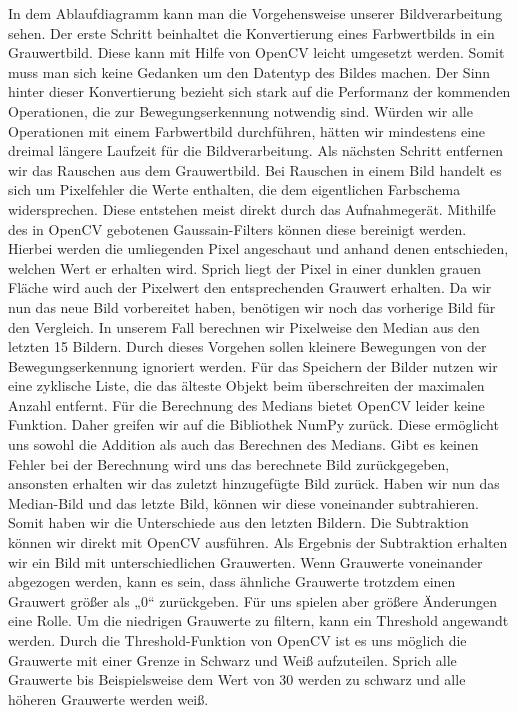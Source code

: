 In dem Ablaufdiagramm kann man die Vorgehensweise unserer Bildverarbeitung sehen. Der erste Schritt beinhaltet die Konvertierung eines Farbwertbilds in ein Grauwertbild. Diese kann mit Hilfe von OpenCV leicht umgesetzt werden. Somit muss man sich keine Gedanken um den Datentyp des Bildes machen. Der Sinn hinter dieser Konvertierung bezieht sich stark auf die Performanz der kommenden Operationen, die zur Bewegungserkennung notwendig sind. Würden wir alle Operationen mit einem Farbwertbild durchführen, hätten wir mindestens eine dreimal längere Laufzeit für die Bildverarbeitung.
Als nächsten Schritt entfernen wir das Rauschen aus dem Grauwertbild. Bei Rauschen in einem Bild handelt es sich um Pixelfehler die Werte enthalten, die dem eigentlichen Farbschema widersprechen. Diese entstehen meist direkt durch das Aufnahmegerät. Mithilfe des in OpenCV gebotenen Gaussain-Filters können diese bereinigt werden. Hierbei werden die umliegenden Pixel angeschaut und anhand denen entschieden, welchen Wert er erhalten wird. Sprich liegt der Pixel in einer dunklen grauen Fläche wird auch der Pixelwert den entsprechenden Grauwert erhalten.
Da wir nun das neue Bild vorbereitet haben, benötigen wir noch das vorherige Bild für den Vergleich. In unserem Fall berechnen wir Pixelweise den Median aus den letzten 15 Bildern. Durch dieses Vorgehen sollen kleinere Bewegungen von der Bewegungserkennung ignoriert werden. Für das Speichern der Bilder nutzen wir eine zyklische Liste, die das älteste Objekt beim überschreiten der maximalen Anzahl entfernt. Für die Berechnung des Medians bietet OpenCV leider keine Funktion. Daher greifen wir auf die Bibliothek NumPy zurück. Diese ermöglicht uns sowohl die Addition als auch das Berechnen des Medians. Gibt es keinen Fehler bei der Berechnung wird uns das berechnete Bild zurückgegeben, ansonsten erhalten wir das zuletzt hinzugefügte Bild zurück.
Haben wir nun das Median-Bild und das letzte Bild, können wir diese voneinander subtrahieren. Somit haben wir die Unterschiede aus den letzten Bildern. Die Subtraktion können wir direkt mit OpenCV ausführen.
Als Ergebnis der Subtraktion erhalten wir ein Bild mit unterschiedlichen Grauwerten. Wenn Grauwerte voneinander abgezogen werden, kann es sein, dass ähnliche Grauwerte trotzdem einen Grauwert größer als „0“ zurückgeben. Für uns spielen aber größere Änderungen eine Rolle. Um die niedrigen Grauwerte zu filtern, kann ein Threshold angewandt werden. Durch die Threshold-Funktion von OpenCV ist es uns möglich die Grauwerte mit einer Grenze in Schwarz und Weiß aufzuteilen.  Sprich alle Grauwerte  bis Beispielsweise dem Wert von 30 werden zu schwarz und alle höheren Grauwerte werden weiß.
